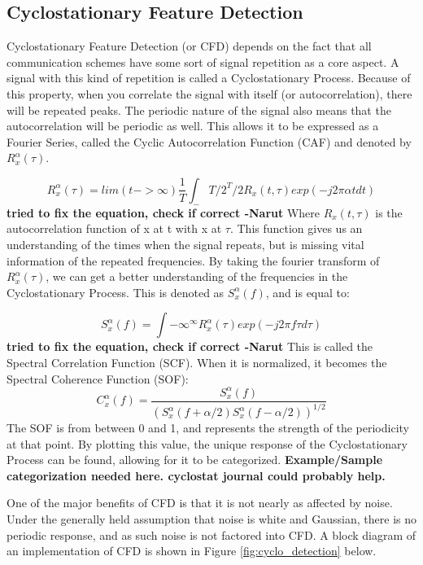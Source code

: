 \subsection{Cyclostationary Feature Detection} \label{Cyclostationary Feature Detection}
Cyclostationary Feature Detection (or CFD) depends on the fact that all communication schemes have some sort of signal repetition as a core aspect. A signal with this kind of repetition is called a Cyclostationary Process\cite{cyclostat_journal}. Because of this property, when you correlate the signal with itself (or autocorrelation), there will be repeated peaks. The periodic nature of the signal also means that the autocorrelation will be periodic as well. This allows it to be expressed as a Fourier Series, called the Cyclic Autocorrelation Function (CAF) and denoted by $R_x^\alpha(\tau)$\cite{cyclostat_text}.\par 
\[R_x^\alpha(\tau)=lim(t->\infty) \frac{1}{T} \int_-T/2^T/2 R_x(t,\tau)exp(-j2\pi\alpha t dt)\] \textbf{tried to fix the equation, check if correct -Narut}
Where $R_x(t,\tau)$ is the autocorrelation function of x at t with x at $\tau$. This function gives us an understanding of the times when the signal repeats, but is missing vital information of the repeated frequencies. By taking the fourier transform of $R_x^\alpha(\tau)$, we can get a better understanding of the frequencies in the Cyclostationary Process. This is denoted as $S_x^\alpha(f)$, and is equal to\cite{cyclostat_text}:  \par
\[ S_x^\alpha(f)=\int{-\infty}^{\infty} R_x^\alpha(\tau)exp(-j2\pi f\tau d\tau) \] \textbf{tried to fix the equation, check if correct -Narut}
This is called the Spectral Correlation Function (SCF). When it is normalized, it becomes the Spectral Coherence Function (SOF)\cite{cyclostat_text}:
\[C_x^\alpha(f) = \frac{ S_x^\alpha(f)}{ (S_x^\alpha(f+\alpha/2) S_x^\alpha(f-\alpha/2))^{1/2}} \]
The SOF is from between 0 and 1, and represents the strength of the periodicity at that point. By plotting this value, the unique response of the Cyclostationary Process can be found, allowing for it to be categorized. \textbf{Example/Sample categorization needed here. cyclostat journal could probably help.}\par
One of the major benefits of CFD is that it is not nearly as affected by noise. Under the generally held assumption that noise is white and Gaussian, there is no periodic response, and as such noise is not factored into CFD. A block diagram of an implementation of CFD is shown in Figure \ref{fig:cyclo_detection} below. \par

